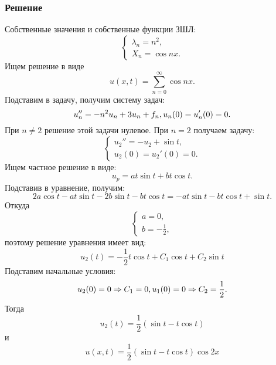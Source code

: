 \documentclass[11pt]{article}
\begin{document}
\subsubsection{Решение}
\label{sec:orgef2b7f2}
Собственные значения и собственные функции ЗШЛ:
\begin{equation}
\begin{cases}
\lambda_n = n^2, \\
X_n = \cos nx.
\end{cases}
\end{equation}
Ищем решение в виде
\begin{equation}
u(x, t) = \sum_{n = 0}^{\infty}\cos nx.
\end{equation}
Подставим в задачу, получим систему задач:
\begin{equation}
u''_n = -n^2u_n + 3u_n + f_n, \\
u_n(0) = u'_n(0) = 0.
\end{equation}
При $n \neq 2$ решение этой задачи нулевое. При $n = 2$ получаем задачу:
\begin{equation}
\begin{cases}
u_2'' = -u_2 + \sin t, \\
u_2(0) = u_2'(0) = 0.
\end{cases}
\end{equation}
Ищем частное решение в виде:
\begin{equation}
u_p = at\sin t + bt\cos t.
\end{equation}
Подставив в уравнение, получим:
\begin{equation}
2a\cos t - at\sin t - 2b\sin t - bt\cos t = -at\sin t - bt\cos t + \sin t.
\end{equation}
Откуда
\begin{equation}
\begin{cases}
a = 0, \\
b = -\frac12,
\end{cases}
\end{equation}
поэтому решение уравнения имеет вид:
\begin{equation}
u_2(t) = -\frac12t\cos t + C_1\cos t + C_2\sin t
\end{equation}
Подставим начальные условия:
\begin{equation}
u_2(0) = 0 \Rightarrow C_1 = 0, \\
u_1(0) = 0 \Rightarrow C_2 = \frac12.
\end{equation}
Тогда
\begin{equation}
u_2(t) = \frac12(\sin t - t\cos t)
\end{equation}
и
\begin{equation}
u(x, t) = \frac12(\sin t - t\cos t)\cos2x
\end{equation}
\end{document}
